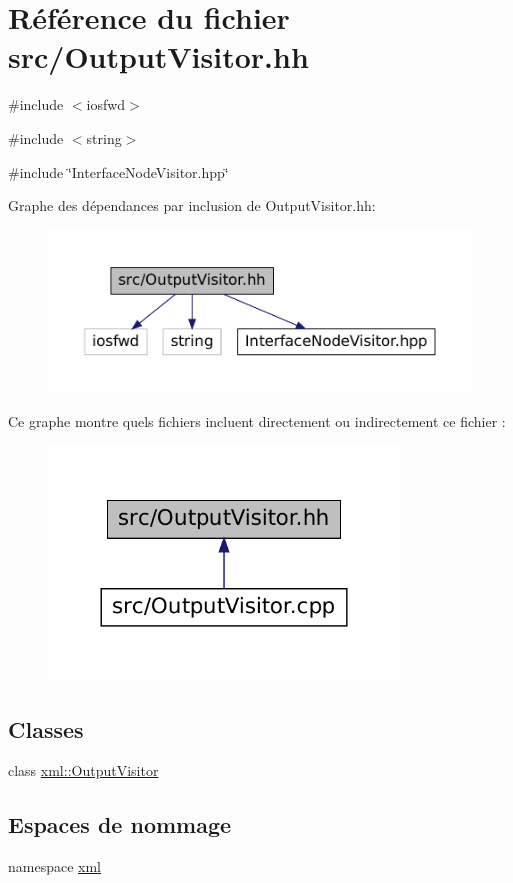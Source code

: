 \hypertarget{_output_visitor_8hh}{
\section{Référence du fichier src/OutputVisitor.hh}
\label{_output_visitor_8hh}
}
{\ttfamily \#include $<$iosfwd$>$}\par
{\ttfamily \#include $<$string$>$}\par
{\ttfamily \#include \char`\"{}InterfaceNodeVisitor.hpp\char`\"{}}\par
Graphe des dépendances par inclusion de OutputVisitor.hh:
\nopagebreak
\begin{figure}[H]
\begin{center}
\leavevmode
\includegraphics[width=400pt]{_output_visitor_8hh__incl}
\end{center}
\end{figure}
Ce graphe montre quels fichiers incluent directement ou indirectement ce fichier :
\nopagebreak
\begin{figure}[H]
\begin{center}
\leavevmode
\includegraphics[width=264pt]{_output_visitor_8hh__dep__incl}
\end{center}
\end{figure}
\subsection*{Classes}
\begin{DoxyCompactItemize}
\item 
class \hyperlink{classxml_1_1_output_visitor}{xml::OutputVisitor}
\end{DoxyCompactItemize}
\subsection*{Espaces de nommage}
\begin{DoxyCompactItemize}
\item 
namespace \hyperlink{namespacexml}{xml}
\end{DoxyCompactItemize}
